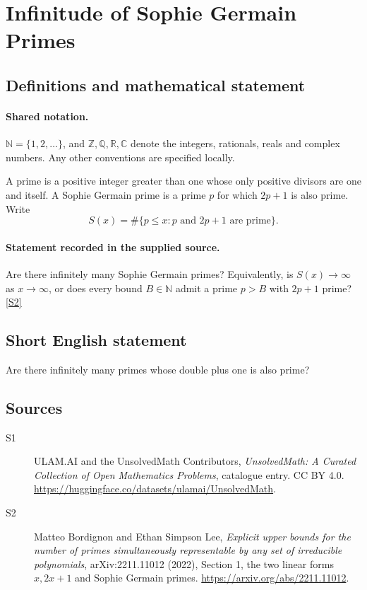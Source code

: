 \documentclass[11pt]{article}
\newcommand{\sref}[2]{\hyperlink{source:#1:#2}{[S#2]}}
\begin{document}
\section{Infinitude of Sophie Germain Primes}\label{statement}

\subsection{Definitions and mathematical statement}

\paragraph{Shared notation.}$\mathbb N=\{1,2,\ldots\}$, and $\mathbb Z,\mathbb Q,\mathbb R,\mathbb C$ denote the integers, rationals, reals and complex numbers. Any other conventions are specified locally.


A prime is a positive integer greater than one whose only
positive divisors are one and itself. A Sophie Germain prime is a prime
\(p\) for which \(2p+1\) is also prime. Write
\[
 S(x)=\#\{p\le x:p\text{ and }2p+1\text{ are prime}\}.
\]
\paragraph{Statement recorded in the supplied source.}
Are there infinitely many Sophie Germain primes?
Equivalently, is \(S(x)\to\infty\) as \(x\to\infty\), or does every
bound \(B\in\mathbb N\) admit a prime \(p>B\) with \(2p+1\) prime? \sref{statement}{2}
\subsection{Short English statement}
Are there infinitely many primes whose double plus one is also prime?
\subsection{Sources}
\begin{description}
\item[\hypertarget{source:statement:1}{S1}] ULAM.AI and the UnsolvedMath Contributors, \emph{UnsolvedMath: A Curated Collection of Open Mathematics Problems}, catalogue entry. CC BY 4.0. \url{https://huggingface.co/datasets/ulamai/UnsolvedMath}.
\item[\hypertarget{source:statement:2}{S2}] Matteo Bordignon and Ethan Simpson Lee, \emph{Explicit upper bounds for the number of primes simultaneously representable by any set of irreducible polynomials}, arXiv:2211.11012 (2022), Section 1, the two linear forms $x,2x+1$ and Sophie Germain primes. \url{https://arxiv.org/abs/2211.11012}.
\end{description}
\label{end:statement}
\end{document}
